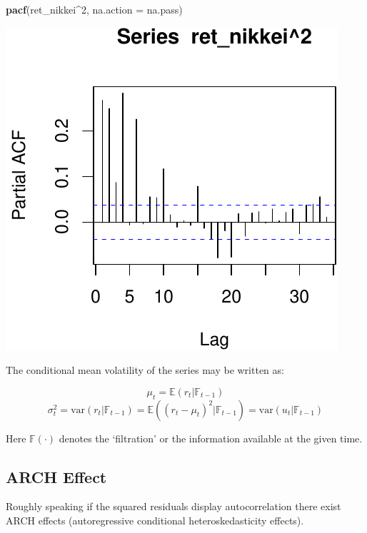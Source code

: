 \documentclass[11pt,]{article}
\newenvironment{Shaded}{\begin{snugshade}}{\end{snugshade}}
\newcommand{\KeywordTok}[1]{\textcolor[rgb]{0.13,0.29,0.53}{\textbf{#1}}}
\newcommand{\DataTypeTok}[1]{\textcolor[rgb]{0.13,0.29,0.53}{#1}}
\newcommand{\DecValTok}[1]{\textcolor[rgb]{0.00,0.00,0.81}{#1}}
\newcommand{\OperatorTok}[1]{\textcolor[rgb]{0.81,0.36,0.00}{\textbf{#1}}}
\newcommand{\NormalTok}[1]{#1}
\begin{document}
\begin{Shaded}
\begin{Highlighting}[]
\KeywordTok{pacf}\NormalTok{(ret_nikkei}\OperatorTok{^}\DecValTok{2}\NormalTok{, }\DataTypeTok{na.action =}\NormalTok{ na.pass)}
\end{Highlighting}
\end{Shaded}

\begin{center}\includegraphics{FMC_T4_PhD_ARMA_GARCH_files/figure-latex/ret_ind_ACF_sq-4} \end{center}

The conditional mean volatility of the series may be written as:

\[\mu_t = \mathbb{E}(r_t|\mathbb{F}_{t-1})\]
\[\sigma_t^2 = \text{var}(r_t|\mathbb{F}_{t-1}) = \mathbb{E}((r_t-\mu_t)^2|\mathbb{F}_{t-1})
=\text{var}(u_t|\mathbb{F}_{t-1})\]

Here \(\mathbb{F}(\cdot)\) denotes the `filtration' or the information
available at the given time.

\subsection{ARCH Effect}\label{arch-effect}

Roughly speaking if the squared residuals display autocorrelation there
exist ARCH effects (autoregressive conditional heteroskedasticity
effects).
\end{document}
